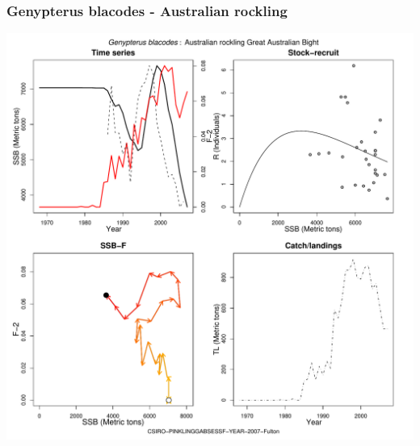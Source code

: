 \subsubsection{Genypterus blacodes - Australian rockling}
\begin{center}
\includegraphics[width=1.2\textwidth]{../R/figures/CSIRO-PINKLINGGABSESSF-YEAR-2007-Fulton.pdf}
\end{center}

